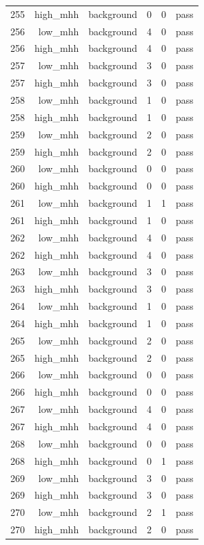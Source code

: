 \begin{table}[htbp]
{\begin{tabular}{lrrrrr}
255 & high\_mhh & background & 0 & 0 & pass \\
256 & low\_mhh & background & 4 & 0 & pass \\
256 & high\_mhh & background & 4 & 0 & pass \\
257 & low\_mhh & background & 3 & 0 & pass \\
257 & high\_mhh & background & 3 & 0 & pass \\
258 & low\_mhh & background & 1 & 0 & pass \\
258 & high\_mhh & background & 1 & 0 & pass \\
259 & low\_mhh & background & 2 & 0 & pass \\
259 & high\_mhh & background & 2 & 0 & pass \\
260 & low\_mhh & background & 0 & 0 & pass \\
260 & high\_mhh & background & 0 & 0 & pass \\
261 & low\_mhh & background & 1 & 1 & pass \\
261 & high\_mhh & background & 1 & 0 & pass \\
262 & low\_mhh & background & 4 & 0 & pass \\
262 & high\_mhh & background & 4 & 0 & pass \\
263 & low\_mhh & background & 3 & 0 & pass \\
263 & high\_mhh & background & 3 & 0 & pass \\
264 & low\_mhh & background & 1 & 0 & pass \\
264 & high\_mhh & background & 1 & 0 & pass \\
265 & low\_mhh & background & 2 & 0 & pass \\
265 & high\_mhh & background & 2 & 0 & pass \\
266 & low\_mhh & background & 0 & 0 & pass \\
266 & high\_mhh & background & 0 & 0 & pass \\
267 & low\_mhh & background & 4 & 0 & pass \\
267 & high\_mhh & background & 4 & 0 & pass \\
268 & low\_mhh & background & 0 & 0 & pass \\
268 & high\_mhh & background & 0 & 1 & pass \\
269 & low\_mhh & background & 3 & 0 & pass \\
269 & high\_mhh & background & 3 & 0 & pass \\
270 & low\_mhh & background & 2 & 1 & pass \\
270 & high\_mhh & background & 2 & 0 & pass \\

\end{tabular}}
\end{table}
